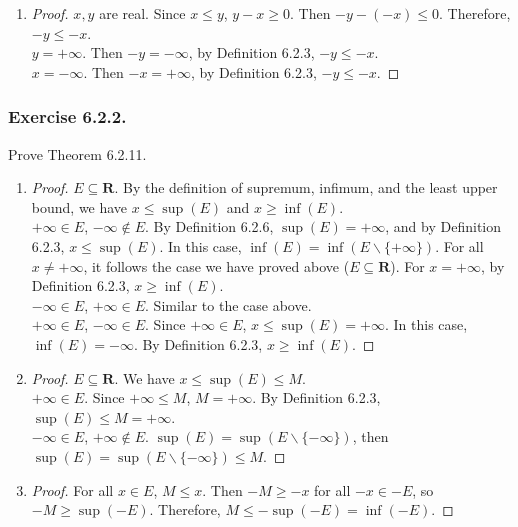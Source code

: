 \documentclass[12pt, letter]{article}
\begin{document}
\begin{enumerate}[label=(\alph*)]
\begin{proof}
        $y=+\infty$. Since $y\leq z$, by Definition 6.2.3, we have $z=+\infty$. Hence, $x\leq z$.\\
        $z=+\infty$. By Definition 6.2.3, $x\leq z$.
    \end{proof}
    \item \begin{proof}
        $x,y$ are real. Since $x\leq y$, $y-x\geq 0$. Then $-y-(-x)\leq 0$. Therefore, $-y\leq -x$.\\
        $y=+\infty$. Then $-y=-\infty$, by Definition 6.2.3, $-y\leq -x$.\\
        $x=-\infty$. Then $-x=+\infty$, by Definition 6.2.3, $-y\leq -x$.
    \end{proof}
\end{enumerate}
\subsubsection*{Exercise 6.2.2.}
Prove Theorem 6.2.11. 
\begin{enumerate}[label=(\alph*)]
    \item \begin{proof}
        $E\subseteq\mathbf{R}$. By the definition of supremum, infimum, and the least upper bound, we have $x\leq\sup(E)$ and $x\geq\inf(E)$.\\
        $+\infty\in E$, $-\infty\notin E$. By Definition 6.2.6, $\sup(E)=+\infty$, and by Definition 6.2.3, $x\leq\sup(E)$. In this case, $\inf(E)=\inf(E\backslash\{+\infty\})$. 
        For all $x\ne +\infty$, it follows the case we have proved above ($E\subseteq\mathbf{R}$). For $x=+\infty$, by Definition 6.2.3, $x\geq\inf(E)$.\\
        $-\infty\in E$, $+\infty\in E$. Similar to the case above.\\
        $+\infty\in E$, $-\infty\in E$. Since $+\infty\in E$, $x\leq\sup(E)=+\infty$. In this case, $\inf(E)=-\infty$. By Definition 6.2.3, $x\geq\inf(E)$.
    \end{proof}
    \item \begin{proof}
        $E\subseteq\mathbf{R}$. We have $x\leq\sup(E)\leq M$.\\
        $+\infty\in E$. Since $+\infty\leq M$, $M=+\infty$. By Definition 6.2.3, $\sup(E)\leq M=+\infty$.\\
        $-\infty\in E$, $+\infty\notin E$. $\sup(E)=\sup(E\backslash\{-\infty\})$, then $\sup(E)=\sup(E\backslash\{-\infty\})\leq M$.
    \end{proof}
    \item \begin{proof}
        For all $x\in E$, $M\leq x$. Then $-M\geq -x$ for all $-x\in -E$, so $-M\geq \sup(-E)$. Therefore, $M\leq -\sup(-E)=\inf(-E)$.  
    \end{proof}
\end{enumerate}
\end{document}
